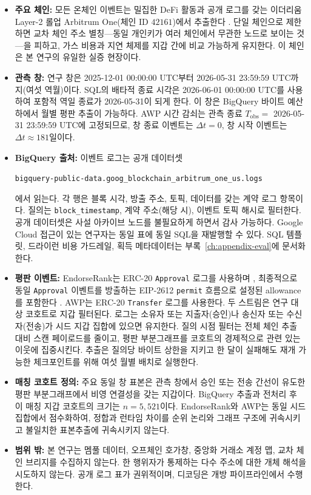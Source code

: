 \begin{itemize}
\item \textbf{주요 체인:} 모든 온체인 이벤트는 밀집한 DeFi 활동과 공개 로그를 갖는 이더리움 Layer-2 롤업 Arbitrum One(체인 ID $42161$)에서 추출한다 . 단일 체인으로 제한하면 교차 체인 주소 별칭---동일 개인키가 여러 체인에서 무관한 노드로 보이는 것---을 피하고, 가스 비용과 지연 체제를 지갑 간에 비교 가능하게 유지한다. 이 체인은 본 연구의 유일한 실증 현장이다.

\item \textbf{관측 창:} 연구 창은 2025-12-01 00:00:00 UTC부터 2026-05-31 23:59:59 UTC까지(여섯 역월)이다. SQL의 배타적 종료 시각은 2026-06-01 00:00:00 UTC를 사용하여 포함적 역일 종료가 2026-05-31이 되게 한다. 이 창은 BigQuery 바이트 예산 하에서 월별 평판 추출이 가능하다. AWP 시간 감쇠는 관측 종료 $T_{\mathrm{obs}}=$ 2026-05-31 23:59:59 UTC에 고정되므로, 창 종료 이벤트는 $\Delta t=0$, 창 시작 이벤트는 $\Delta t\approx 181$일이다.

\item \textbf{BigQuery 출처:} 이벤트 로그는 공개 데이터셋
\begin{center}
\texttt{bigquery-public-data.goog\_blockchain\_arbitrum\_one\_us.logs}
\end{center}
에서 읽는다. 각 행은 블록 시각, 방출 주소, 토픽, 데이터를 갖는 계약 로그 항목이다. 질의는 \texttt{block\_timestamp}, 계약 주소(해당 시), 이벤트 토픽 해시로 필터한다. 공개 데이터셋은 사설 아카이브 노드를 불필요하게 하면서 감사 가능하다. Google Cloud 접근이 있는 연구자는 동일 표에 동일 SQL을 재발행할 수 있다. SQL 템플릿, 드라이런 비용 가드레일, 획득 메타데이터는 부록~\ref{ch:appendix-eval}에 문서화한다.

\item \textbf{평판 이벤트:} EndorseRank는 ERC-20 \texttt{Approval} 로그를 사용하며 , 최종적으로 동일 \texttt{Approval} 이벤트를 방출하는 EIP-2612 \texttt{permit} 흐름으로 설정된 allowance를 포함한다 . AWP는 ERC-20 \texttt{Transfer} 로그를 사용한다. 두 스트림은 연구 대상 코호트로 지갑 필터된다. 로그는 소유자 또는 지출자(승인)나 송신자 또는 수신자(전송)가 시드 지갑 집합에 있으면 유지한다. 질의 시점 필터는 전체 체인 추출 대비 스캔 페이로드를 줄이고, 평판 부분그래프를 코호트의 경제적으로 관련 있는 이웃에 집중시킨다. 추출은 질의당 바이트 상한을 지키고 한 달이 실패해도 재개 가능한 체크포인트를 위해 여섯 월별 배치로 실행한다.

\item \textbf{매칭 코호트 정의:} 주요 동일 창 표본은 관측 창에서 승인 또는 전송 간선이 유도한 평판 부분그래프에서 비영 연결성을 갖는 지갑이다. BigQuery 추출과 전처리 후 이 매칭 지갑 코호트의 크기는 $n=5{,}521$이다. EndorseRank와 AWP는 동일 시드 집합에서 점수화하여, 정합과 런타임 차이를 순위 논리와 그래프 구조에 귀속시키고 불일치한 표본추출에 귀속시키지 않는다.

\item \textbf{범위 밖:} 본 연구는 멤풀 데이터, 오프체인 호가창, 중앙화 거래소 계정 맵, 교차 체인 브리지를 수집하지 않는다. 한 행위자가 통제하는 다수 주소에 대한 개체 해석을 시도하지 않는다. 공개 로그 표가 권위적이며, 디코딩은 개방 파이프라인에서 수행한다.

\end{itemize}

